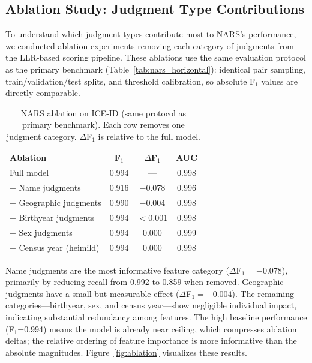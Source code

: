 \documentclass{article}
\begin{document}
\subsection{Ablation Study: Judgment Type Contributions}
\label{sec:ablations}

To understand which judgment types contribute most to NARS's performance, we conducted ablation experiments removing each category of judgments from the LLR-based scoring pipeline. These ablations use the same evaluation protocol as the primary benchmark (Table~\ref{tab:nars_horizontal}): identical pair sampling, train/validation/test splits, and threshold calibration, so absolute F$_1$ values are directly comparable.

\begin{table}[H]
  \centering
  \small
  \caption{NARS ablation on ICE-ID (same protocol as primary benchmark). Each row removes one judgment category. $\Delta$F$_1$ is relative to the full model.}
  \label{tab:ablations}
  \begin{tabular}{lccc}
    \toprule
    \textbf{Ablation} & \textbf{F$_1$} & \textbf{$\Delta$F$_1$} & \textbf{AUC} \\
    \midrule
    Full model & 0.994 & --- & 0.998 \\
    $-$ Name judgments & 0.916 & $-$0.078 & 0.996 \\
    $-$ Geographic judgments & 0.990 & $-$0.004 & 0.998 \\
    $-$ Birthyear judgments & 0.994 & $<$0.001 & 0.998 \\
    $-$ Sex judgments & 0.994 & 0.000 & 0.999 \\
    $-$ Census year (heimild) & 0.994 & 0.000 & 0.998 \\
    \bottomrule
  \end{tabular}
\end{table}

Name judgments are the most informative feature category ($\Delta$F$_1 = -0.078$), primarily by reducing recall from 0.992 to 0.859 when removed. Geographic judgments have a small but measurable effect ($\Delta$F$_1 = -0.004$). The remaining categories---birthyear, sex, and census year---show negligible individual impact, indicating substantial redundancy among features. The high baseline performance (F$_1$=0.994) means the model is already near ceiling, which compresses ablation deltas; the relative ordering of feature importance is more informative than the absolute magnitudes. Figure~\ref{fig:ablation} visualizes these results.
\end{document}

